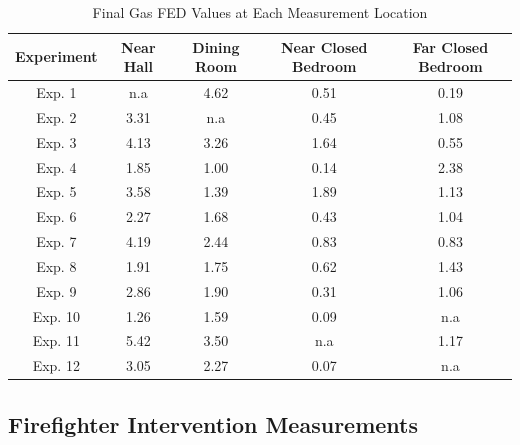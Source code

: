 \documentclass[12pt,oneside]{article}
\begin{document}
\begin{table}[!ht]
    \centering
    \caption{Final Gas FED Values at Each Measurement Location}
    \label{tab:final_fed}
    \begin{tabular}{ccccc}
    \toprule[1.5pt]
	\textbf{Experiment}  &   \textbf{Near Hall}& \textbf{Dining Room}& \textbf{Near Closed Bedroom}& \textbf{Far Closed Bedroom} \\ 
	  \midrule                                                                   
 Exp. 1&       n.a&     4.62&         0.51&        0.19 \\
 Exp. 2&      3.31&      n.a&         0.45&        1.08 \\
 Exp. 3&      4.13&     3.26&         1.64&        0.55 \\
 Exp. 4&      1.85&     1.00&         0.14&        2.38 \\
 Exp. 5&      3.58&     1.39&         1.89&        1.13 \\
 Exp. 6&      2.27&     1.68&         0.43&        1.04 \\
 Exp. 7&      4.19&     2.44&         0.83&        0.83 \\
 Exp. 8&      1.91&     1.75&         0.62&        1.43 \\
 Exp. 9&      2.86&      1.90&        0.31&        1.06 \\
 Exp. 10&      1.26&     1.59&        0.09&         n.a \\
 Exp. 11&      5.42&      3.50&          n.a&        1.17 \\
 Exp. 12&      3.05&     2.27&         0.07&         n.a \\         
	 \bottomrule[1.25pt] 

    \end{tabular}
\end{table}

\subsection{Firefighter Intervention Measurements}
\label{subsec:ff_int}
\end{document}
